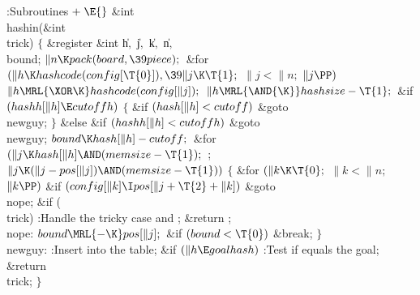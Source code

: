 \Y\B\4:Subroutines\X${}\mathrel+\E{}$\6
\&{int} \\{hashin}(\&{int} \\{trick})\1\1\2\2\6
${}\{{}$\1\6
\&{register} \&{int} \|h${},{}$ \|j${},{}$ \|k${},{}$ \|n${},{}$ \\{bound};\7
${}\|n\K\\{pack}(\\{board},\39\\{piece});{}$\6
\&{for} ${}(\|h\K\\{hashcode}(\\{config}[\T{0}]),\39\|j\K\T{1};{}$ ${}\|j<%
\|n;{}$ ${}\|j\PP){}$\1\5
${}\|h\MRL{{\XOR}{\K}}\\{hashcode}(\\{config}[\|j]);{}$\2\6
${}\|h\MRL{\AND{\K}}\\{hashsize}-\T{1};{}$\6
\&{if} ${}(\\{hashh}[\|h]\E\\{cutoffh}){}$\5
${}\{{}$\1\6
\&{if} ${}(\\{hash}[\|h]<\\{cutoff}){}$\1\5
\&{goto} \\{newguy};\2\6
\4${}\}{}$\5
\2\&{else} \&{if} ${}(\\{hashh}[\|h]<\\{cutoffh}){}$\1\5
\&{goto} \\{newguy};\2\6
${}\\{bound}\K\\{hash}[\|h]-\\{cutoff};{}$\6
\&{for} ${}(\|j\K\\{hash}[\|h]\AND(\\{memsize}-\T{1});{}$  ; ${}\|j\K(\|j-%
\\{pos}[\|j])\AND(\\{memsize}-\T{1})){}$\5
${}\{{}$\1\6
\&{for} ${}(\|k\K\T{0};{}$ ${}\|k<\|n;{}$ ${}\|k\PP){}$\1\6
\&{if} ${}(\\{config}[\|k]\I\\{pos}[\|j+\T{2}+\|k]){}$\1\5
\&{goto} \\{nope};\2\2\6
\&{if} (\\{trick})\1\5
:Handle the tricky case and \X;\2\6
\&{return} ;\6
\4\\{nope}:\5
${}\\{bound}\MRL{-{\K}}\\{pos}[\|j];{}$\6
\&{if} ${}(\\{bound}<\T{0}){}$\1\5
\&{break};\2\6
\4${}\}{}$\2\6
\4\\{newguy}:\5
:Insert  into the  table\X;\6
\&{if} ${}(\|h\E\\{goalhash}){}$\1\5
:Test if  equals the goal\X;\2\6
\&{return} \\{trick};\6
\4${}\}{}$\2\par
\fi

